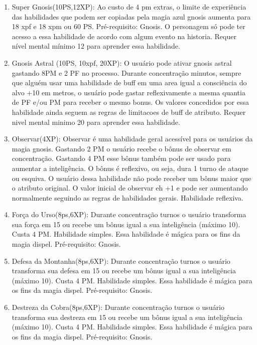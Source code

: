 \begin{enumerate}
	\item Super Gnosis(10PS,12XP): Ao custo de 4 pm extras, o limite de experiência das habilidades que podem ser copiadas pela magia azul gnosis aumenta para 18 xpf e 18 xpm ou 60 PS. Pré-requisito: Gnosis. O personagem só pode ter acesso a essa habilidade de acordo com algum evento na historia. Requer nível mental mínimo 12 para aprender essa habilidade.
	
	\item Gnosis Astral (10PS, 10xpf, 20XP): O usuário pode ativar gnosis astral gastando 8PM e 2 PF no processo. Durante concentração minutos, sempre que alguém usar uma habilidade de buff em uma area igual a consciência do alvo +10 em metros, o usuário pode gastar reflexivamente a mesma quantia de PF e/ou PM para receber o mesmo bonus. Os valores concedidos por essa habilidade ainda seguem as regras de limitacoes de buff de atributo. Requer nivel mental minimo 20 para aprender essa habilidade.
	
	\item Observar(4XP): Observar é uma habilidade geral acessível para os usuários da magia gnosis. Gastando 2 PM o usuário recebe o bônus de observar em concentração. Gastando 4 PM esse bônus também pode ser usado para aumentar a inteligência. O bônus é reflexivo, ou seja, dura 1 turno de ataque ou esquiva. O usuário dessa habilidade não pode receber um bônus maior que o atributo original. O valor inicial de observar eh +1 e pode ser aumentando normalmente seguindo as regras de habilidades gerais. Habilidade reflexiva.	
 
	\item Força do Urso(8ps,6XP): Durante concentração turnos o usuário transforma sua força em 15 ou recebe um bônus igual a sua inteligência (máximo 10). Custa 4 PM. Habilidade simples. Essa habilidade é mágica para os fins da magia dispel. Pré-requisito: Gnosis.

	\item Defesa da Montanha(8ps,6XP): Durante concentração turnos o usuário transforma sua defesa em 15 ou recebe um bônus igual a sua inteligência (máximo 10). Custa 4 PM. Habilidade simples. Essa habilidade é mágica para os fins da magia dispel. Pré-requisito: Gnosis.

	\item Destreza da Cobra(8ps,6XP): Durante concentração turnos o usuário transforma sua destreza em 15 ou recebe um bônus igual a sua inteligência (máximo 10). Custa 4 PM. Habilidade simples. Essa habilidade é mágica para os fins da magia dispel. Pré-requisito: Gnosis.


\end{enumerate}
